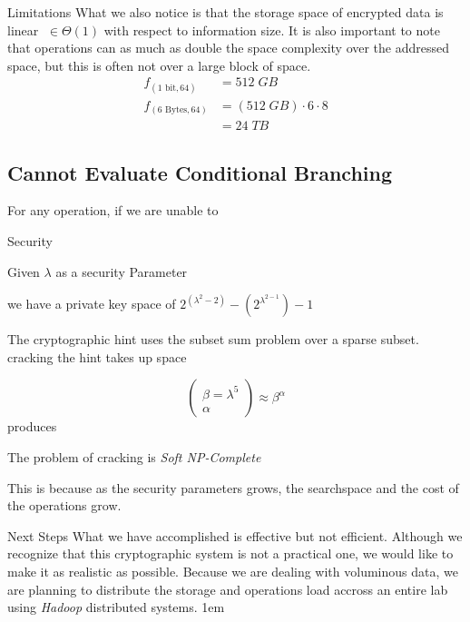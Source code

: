 \documentclass[a0,portrait]{a0poster}
\begin{document}
\begin{multicols}{2}
\begin{slide}{Limitations}
  What we also notice is that the storage space of encrypted data is linear \(\;\in\Theta(1)\) with respect to information size.  It is also important to note that operations can as much as double the space complexity over the addressed space, but this is often not over a large block of space.
\begin{align*}
f_{(1\text{ bit},64)}&=512\; GB\\
f_{(6\text{ Bytes},64)}&=(512\; GB)\cdot6\cdot 8\\&=24\; TB
\end{align*}

\subsection*{Cannot Evaluate Conditional Branching}
For any operation, if we are unable to 

\end{slide}

\begin{slide}{Security}

Given \(\lambda\) as a security Parameter 

we have a private key space of \(2^{(\lambda^2-2)} - (2^{\lambda^{2-1}})-1\)

The cryptographic hint uses the subset sum problem over a sparse subset. cracking the hint takes up space 

\[\left(\begin{matrix}\beta = \lambda^5\\\alpha \end{matrix}\right)\approx \beta^\alpha\] produces


The problem of cracking is {\em Soft NP-Complete}

This is because as the security parameters grows, the searchspace and the cost of the operations grow. 
\end{slide}

\begin{slide}{Next Steps}
  What we have accomplished is effective but not efficient. Although we recognize that this cryptographic system is not a practical one, we would like to make it as realistic as possible. Because we are dealing with voluminous data, we are planning to distribute the storage and operations load accross an entire lab using {\em Hadoop} distributed systems. 
\parskip 1em 


\end{slide}
\end{multicols}
\end{document}
